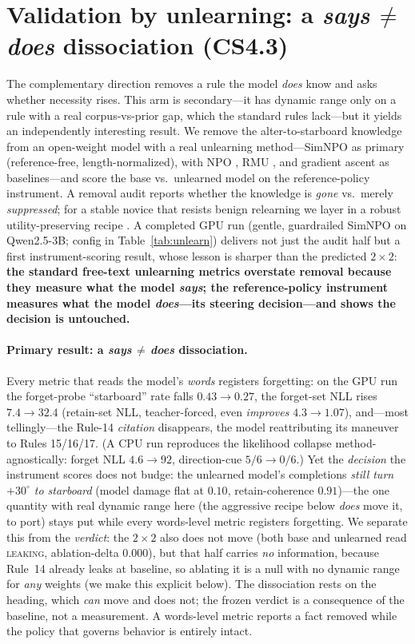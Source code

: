 \documentclass{article}
\begin{document}
\section{Validation by unlearning: a \emph{says\,$\neq$\,does} dissociation (CS4.3)}
\label{app:unlearning}
\label{sec:unlearning}
The complementary direction removes a rule the model \emph{does} know and asks whether necessity
rises. This arm is secondary---it has dynamic range only on a rule with a real corpus-vs-prior
gap, which the standard rules lack---but it yields an independently interesting result. We remove
the alter-to-starboard knowledge from an open-weight model with a real unlearning method---SimNPO
\citep{simnpo2024} as primary (reference-free, length-normalized), with NPO \citep{npo2024}, RMU
\citep{rmu2024}, and gradient ascent \citep{ga2023} as baselines---and score the base vs.\ unlearned
model on the reference-policy instrument. A removal audit \citep{lynch2024} reports whether the
knowledge is \emph{gone} vs.\ merely \emph{suppressed}; for a stable novice that resists
benign relearning we layer in a robust utility-preserving recipe \citep{unlearninglasts2025}.
A completed GPU run (gentle, guardrailed SimNPO on Qwen2.5-3B; config in Table~\ref{tab:unlearn})
delivers not just the audit half but a first instrument-scoring result, whose lesson is sharper
than the predicted
$2\times2$: \textbf{the standard free-text unlearning metrics overstate removal because they
measure what the model \emph{says}; the reference-policy instrument measures what the model
\emph{does}---its steering decision---and shows the decision is untouched.}

\paragraph{Primary result: a \emph{says\,$\neq$\,does} dissociation.}
Every metric that reads the model's \emph{words} registers forgetting: on the GPU run the
forget-probe ``starboard'' rate falls $0.43\to0.27$, the forget-set NLL rises $7.4\to32.4$
(retain-set NLL, teacher-forced, even \emph{improves} $4.3\to1.07$), and---most tellingly---the
Rule-14 \emph{citation} disappears, the model reattributing its maneuver to Rules 15/16/17. (A CPU
run reproduces the likelihood collapse method-agnostically: forget NLL $4.6\to92$, direction-cue
$5/6\to0/6$.) Yet the \emph{decision} the instrument scores does not budge: the unlearned model's completions
\emph{still turn $+30^\circ$ to starboard} (model damage flat at $0.10$, retain-coherence $0.91$)---the
one quantity with real dynamic range here (the aggressive recipe below \emph{does} move it, to port)
stays put while every words-level metric registers forgetting. We separate this from the
\emph{verdict}: the $2\times2$ also does not move (both base and unlearned read \textsc{leaking},
ablation-delta $0.000$), but that half carries \emph{no} information, because Rule~14 already leaks at
baseline, so ablating it is a null with no dynamic range for \emph{any} weights (we make this explicit
below). The dissociation rests on the heading, which \emph{can} move and does not; the frozen verdict
is a consequence of the baseline, not a measurement. A words-level metric reports a fact removed while
the policy that governs behavior is entirely intact.
\end{document}
